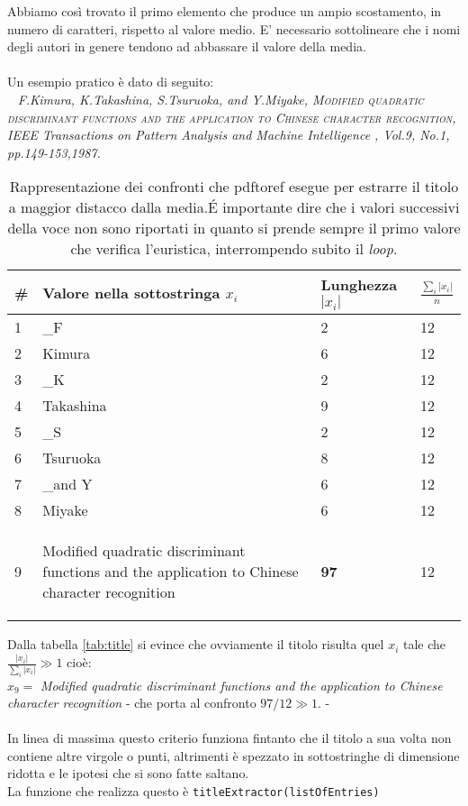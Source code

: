 Abbiamo così trovato il primo elemento che produce un ampio scostamento, in numero di caratteri, rispetto al valore medio. E' necessario sottolineare che i nomi degli autori in genere tendono ad abbassare il valore della media.
\\~\\
Un esempio pratico è dato di seguito:
\\~
\textit{F.Kimura, K.Takashina, S.Tsuruoka, and Y.Miyake, \textsc{Modified quadratic discriminant functions and the application to Chinese character recognition}, IEEE Transactions on Pattern Analysis and Machine Intelligence , Vol.9, No.1, pp.149-153,1987. }
\\
\begin{table}\label{tab:title}
\begin{center}
\begin{tabular}[b]{|l|l|l|l|} \hline
	\#  & Valore nella sottostringa $x_i$ & Lunghezza $|x_i|$ & $  \frac{\sum_i |x_i|}{n}$  \\ \hline
	1 & \_F & 2 & 12 \\  
	2 & Kimura & 6 & 12 \\ 
	3 & \_K & 2 & 12 \\ 
	4 & Takashina & 9 & 12 \\
	5 & \_S & 2 & 12 \\
	6 & Tsuruoka & 8 & 12 \\
	7 & \_and Y & 6 & 12 \\
	8 & Miyake & 6 & 12 \\ 
	9 & \begin{scriptsize}Modified quadratic discriminant functions and the  application to Chinese character recognition\end{scriptsize} & \textbf{97} & 12 \\ \hline
\end{tabular}

\tiny{\caption{Rappresentazione dei confronti che pdftoref esegue per estrarre il titolo a maggior distacco dalla media.\'E importante dire che i valori successivi della voce non sono riportati in quanto si prende sempre il primo valore che verifica l'euristica, interrompendo subito il \textit{loop}.}}

\label{label}
\end{center}
\end{table}

Dalla tabella \ref{tab:title} si evince che ovviamente il titolo risulta quel $x_i$ tale che $ \frac{|x_i|}{ \sum_i |x_i|} \gg 1 $ cioè:
\\ $ x_9= $ \textit{Modified quadratic discriminant functions and the application to Chinese character recognition} - che porta al confronto $97/12 \gg 1$. -
\\~\\
In linea di massima questo criterio funziona fintanto che il titolo a sua volta non contiene altre virgole o punti, altrimenti è spezzato in sottostringhe di dimensione ridotta e le ipotesi che si sono fatte saltano. \\ La funzione che realizza questo è \texttt{titleExtractor(listOfEntries)}


